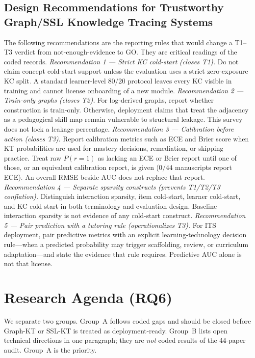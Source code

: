 \documentclass[lettersize,journal]{IEEEtran}
\begin{document}
\subsection{Design Recommendations for Trustworthy Graph/SSL Knowledge Tracing Systems}
\label{sec:design_recs}
The following recommendations are the reporting rules that would change a T1--T3 verdict from not-enough-evidence to GO. They are critical readings of the coded records.
\textit{Recommendation 1 --- Strict KC cold-start (closes T1).} Do not claim concept cold-start support unless the evaluation uses a strict zero-exposure KC split. A standard learner-level 80/20 protocol leaves every KC visible in training and cannot license onboarding of a new module.
\textit{Recommendation 2 --- Train-only graphs (closes T2).} For log-derived graphs, report whether construction is train-only. Otherwise, deployment claims that treat the adjacency as a pedagogical skill map remain vulnerable to structural leakage. This survey does not lock a leakage percentage.
\textit{Recommendation 3 --- Calibration before action (closes T3).} Report calibration metrics such as ECE and Brier score when KT probabilities are used for mastery decisions, remediation, or skipping practice. Treat raw $P(r=1)$ as lacking an ECE or Brier report until one of those, or an equivalent calibration report, is given ($0/44$ manuscripts report ECE). An overall RMSE beside AUC does not replace that report.
\textit{Recommendation 4 --- Separate sparsity constructs (prevents T1/T2/T3 conflation).} Distinguish interaction sparsity, item cold-start, learner cold-start, and KC cold-start in both terminology and evaluation design. Baseline interaction sparsity is not evidence of any cold-start construct.
\textit{Recommendation 5 --- Pair prediction with a tutoring rule (operationalizes T3).} For ITS deployment, pair predictive metrics with an explicit learning-technology decision rule---when a predicted probability may trigger scaffolding, review, or curriculum adaptation---and state the evidence that rule requires. Predictive AUC alone is not that license.

\section{Research Agenda (RQ6)}
\label{sec:agenda}
We separate two groups. Group~A follows coded gaps and should be closed before Graph-KT or SSL-KT is treated as deployment-ready. Group~B lists open technical directions in one paragraph; they are \emph{not} coded results of the 44-paper audit. Group~A is the priority.
\end{document}
